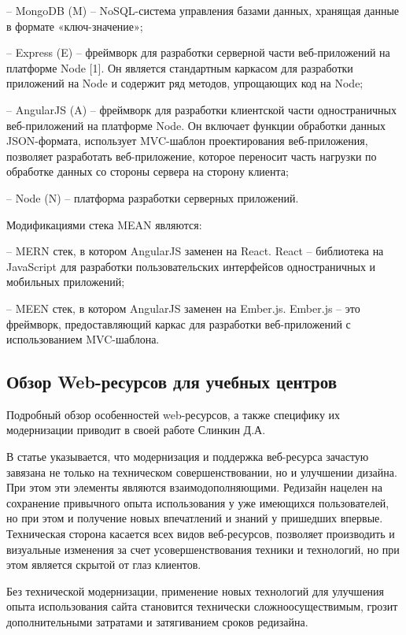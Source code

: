 -- MongoDB (M) -- NoSQL-система управления базами данных, хранящая данные в формате
«ключ-значение»;

-- Express (E) -- фреймворк для разработки серверной части веб-приложений на платформе Node
[1]. Он является стандартным каркасом для разработки приложений на Node и содержит ряд методов, упрощающих код на Node;

-- AngularJS (A) -- фреймворк для разработки клиентской части одностраничных веб-приложений на платформе Node.
Он включает функции обработки данных JSON-формата, использует MVC-шаблон проектирования веб-приложения, позволяет разработать веб-приложение, которое переносит часть нагрузки по обработке данных со стороны сервера на сторону клиента;

-- Node (N) -- платформа разработки серверных приложений.

Модификациями стека MEAN являются:

-- MERN стек, в котором AngularJS заменен на React.
React -- библиотека на JavaScript для разработки пользовательских интерфейсов одностраничных и мобильных приложений;

-- MEEN стек, в котором AngularJS заменен на Ember.js.
Ember.js -- это фреймворк, предоставляющий каркас для разработки веб-приложений с использованием MVC-шаблона.

\subsection{Обзор Web-ресурсов для учебных центров}

Подробный обзор особенностей web-ресурсов, а также специфику их модернизации приводит в своей работе \cite{slinkin-sovremennie} Слинкин Д.А.

В статье указывается, что модернизация и поддержка веб-ресурса зачастую завязана не только на техническом совершенствовании, но и улучшении дизайна.
При этом эти элементы являются взаимодополняющими.
Редизайн нацелен на сохранение привычного опыта использования у уже имеющихся пользователей, но при этом и получение новых впечатлений и знаний у пришедших впервые.
Техническая сторона касается всех видов веб-ресурсов, позволяет производить и визуальные изменения за счет усовершенствования техники и технологий, но при этом является скрытой от глаз клиентов.

Без технической модернизации, применение новых технологий для улучшения опыта использования сайта становится технически сложноосуществимым, грозит дополнительными затратами и затягиванием сроков редизайна.

